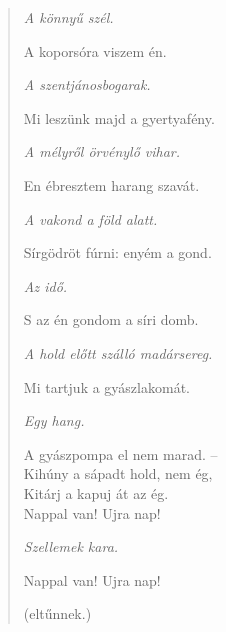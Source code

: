 \begin{verse}
\textit{A könnyű szél.}

\smallskip

\frqq A koporsóra viszem én. \flqq

\smallskip

\textit{A szentjánosbogarak.}

\smallskip

\frqq Mi leszünk majd a gyertyafény. \flqq

\smallskip

\textit{A mélyről örvénylő vihar.}

\smallskip

\frqq En ébresztem harang szavát. \flqq

\smallskip

\textit{A vakond a föld alatt.}

\smallskip

\frqq Sírgödröt fúrni: enyém a gond. \flqq

\smallskip

\textit{Az idő.}

\smallskip

\frqq S az én gondom a síri domb. \flqq

\smallskip

\textit{A hold előtt szálló madársereg.}

\smallskip

\frqq Mi tartjuk a gyászlakomát. \flqq

\smallskip

\textit{Egy hang.}

\smallskip

\frqq A gyászpompa el nem marad. -- \\
Kihúny a sápadt hold, nem ég, \\
Kitárj a kapuj át az ég. \\
Nappal van! Ujra nap! \flqq

\smallskip

\textit{Szellemek kara.}

\smallskip

\frqq Nappal van! Ujra nap! \flqq

\smallskip

(eltűnnek.)

\smallskip


\end{verse}